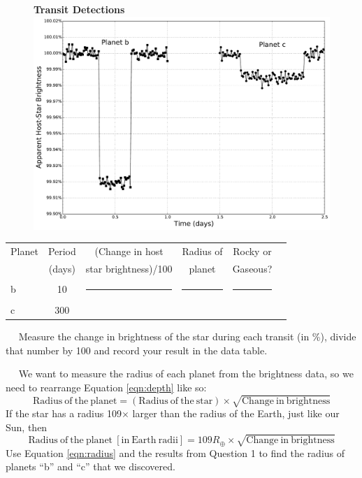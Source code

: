 \documentclass[12pt]{article}
\newcommand{\question}[1]{\vspace{10mm} \noindent {\bf #1)}~~}
\begin{document}
\begin{figure}[h!]
\centering
{\bf Transit Detections} \\
\includegraphics[scale=0.5]{plots/faketransit.pdf}
\end{figure}

\vfill

\begin{table}[h!]
\centering
\begin{tabular}{|l |c |c| c| c| c|}
\hline
Planet & Period & (Change in host & Radius of & Rocky or  \\
 & (days) & star brightness)/100  &  planet  &  Gaseous? \\ \hline
b & 10 & \rule{0pt}{1.5cm} \rule{4cm}{0pt} & \rule{4cm}{0pt} & \rule{4cm}{0pt}\\ \hline
c & 300 & \rule{0pt}{1.5cm} & &\\ \hline
\end{tabular}
\end{table}

\pagebreak

\question{1} Measure the change in brightness of the star during each transit (in \%), divide that  number by 100 and record your result in the data table. 

\question{2} We want to measure the radius of each planet from the brightness data, so we need to rearrange Equation \ref{eqn:depth} like so:
\begin{equation}
\mathrm{Radius~of~the~planet} = \left( \mathrm{Radius~of~the~star} \right) \times \sqrt{\mathrm{Change~in~brightness}}
\end{equation}
If the star has a radius 109$\times$ larger than the radius of the Earth, just like our Sun, then 
\begin{equation}
\mathrm{Radius~of~the~planet~[in~Earth~radii]} = 109R_\oplus  \times \sqrt{\mathrm{Change~in~brightness}} \label{eqn:radius}
\end{equation}
Use Equation \ref{eqn:radius} and the results from Question 1 to find the radius of planets ``b'' and ``c'' that we discovered. 
\end{document}
